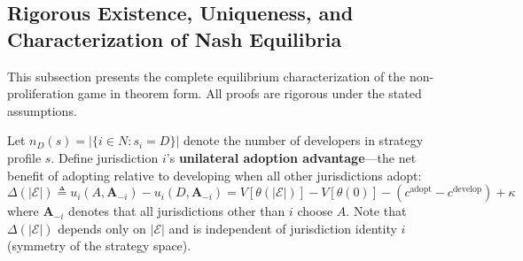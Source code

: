 \documentclass[12pt,a4paper]{article}
\theoremstyle{definition}
\theoremstyle{remark}
\begin{document}
\subsection{Rigorous Existence, Uniqueness, and Characterization of Nash Equilibria}

This subsection presents the complete equilibrium characterization of the non-proliferation game in theorem form. All proofs are rigorous under the stated assumptions.

Let $n_D(s) = |\{i \in N : s_i = D\}|$ denote the number of developers in strategy profile $s$. Define jurisdiction $i$'s \textbf{unilateral adoption advantage}—the net benefit of adopting relative to developing when all other jurisdictions adopt:
\begin{equation}
\Delta(|\mathcal{E}|) \triangleq u_i(A, \mathbf{A}_{-i}) - u_i(D, \mathbf{A}_{-i}) = V[\theta(|\mathcal{E}|)] - V[\theta(0)] - (c^{\text{adopt}} - c^{\text{develop}}) + \kappa
\label{eq:adoption-advantage-def}
\end{equation}
where $\mathbf{A}_{-i}$ denotes that all jurisdictions other than $i$ choose $A$. Note that $\Delta(|\mathcal{E}|)$ depends only on $|\mathcal{E}|$ and is independent of jurisdiction identity $i$ (symmetry of the strategy space).
\end{document}
